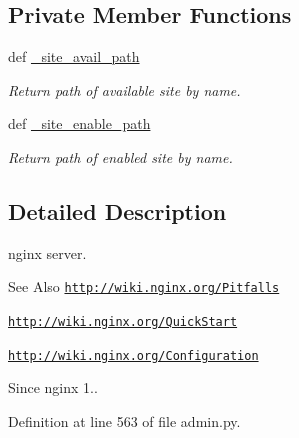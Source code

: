 \subsection*{Private Member Functions}
\begin{DoxyCompactItemize}
\item 
def \hyperlink{classadmin_1_1www_1_1nginx_aca978777776a324a0c3ac506100da002}{\-\_\-site\-\_\-avail\-\_\-path}
\begin{DoxyCompactList}\small\item\em Return path of available site by name. \end{DoxyCompactList}\item 
def \hyperlink{classadmin_1_1www_1_1nginx_af4bc4f7da3d2c56ba8e4b61b16052394}{\-\_\-site\-\_\-enable\-\_\-path}
\begin{DoxyCompactList}\small\item\em Return path of enabled site by name. \end{DoxyCompactList}\end{DoxyCompactItemize}


\subsection{Detailed Description}
nginx server. 

\begin{DoxySeeAlso}{See Also}
\href{http://wiki.nginx.org/Pitfalls}{\tt http\-://wiki.\-nginx.\-org/\-Pitfalls} 

\href{http://wiki.nginx.org/QuickStart}{\tt http\-://wiki.\-nginx.\-org/\-Quick\-Start} 

\href{http://wiki.nginx.org/Configuration}{\tt http\-://wiki.\-nginx.\-org/\-Configuration} 
\end{DoxySeeAlso}
\begin{DoxySince}{Since}
nginx 1.. 
\end{DoxySince}


Definition at line 563 of file admin.\-py.




